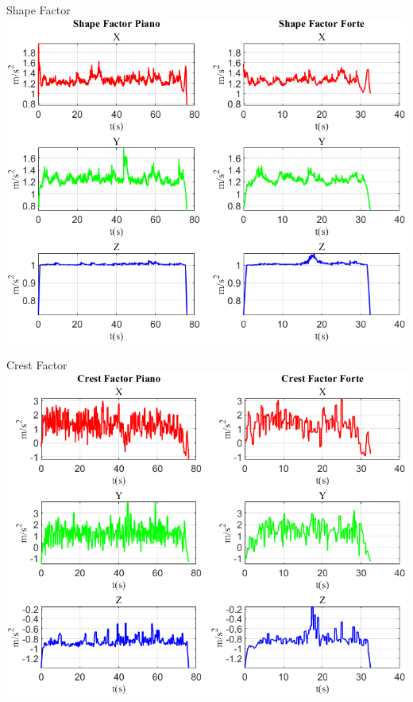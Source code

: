 	\begin{frame}{{Shape Factor}}
		\centering\includegraphics[height=.8\textheight]{figure/Acc/Shape Factor}
	\end{frame}
	
	\begin{frame}{{Crest Factor}}
		\centering\includegraphics[height=.8\textheight]{figure/Acc/Crest Factor}
	\end{frame}
	
